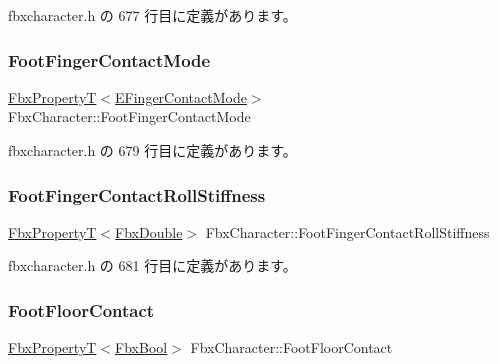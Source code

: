  fbxcharacter.\+h の 677 行目に定義があります。

\mbox{\label{class_fbx_character_aa5a1aff18a78246caf880e1ea425077b}} 
\subsubsection{\texorpdfstring{Foot\+Finger\+Contact\+Mode}{FootFingerContactMode}}
{\footnotesize\ttfamily \hyperlink{class_fbx_property_t}{Fbx\+PropertyT}$<$\hyperlink{class_fbx_character_a97bd5ed3c7b4a63bf46ef111e7dc0f0a}{E\+Finger\+Contact\+Mode}$>$ Fbx\+Character\+::\+Foot\+Finger\+Contact\+Mode}



 fbxcharacter.\+h の 679 行目に定義があります。

\mbox{\label{class_fbx_character_a477a716a10b48576053524a183841a08}} 
\subsubsection{\texorpdfstring{Foot\+Finger\+Contact\+Roll\+Stiffness}{FootFingerContactRollStiffness}}
{\footnotesize\ttfamily \hyperlink{class_fbx_property_t}{Fbx\+PropertyT}$<$\hyperlink{fbxtypes_8h_a171e72a1c46fc15c1a6c9c31948c1c5b}{Fbx\+Double}$>$ Fbx\+Character\+::\+Foot\+Finger\+Contact\+Roll\+Stiffness}



 fbxcharacter.\+h の 681 行目に定義があります。

\mbox{\label{class_fbx_character_a706b4efffc81b093dcb2d9118a1cdb6b}} 
\subsubsection{\texorpdfstring{Foot\+Floor\+Contact}{FootFloorContact}}
{\footnotesize\ttfamily \hyperlink{class_fbx_property_t}{Fbx\+PropertyT}$<$\hyperlink{fbxtypes_8h_a92e0562b2fe33e76a242f498b362262e}{Fbx\+Bool}$>$ Fbx\+Character\+::\+Foot\+Floor\+Contact}



